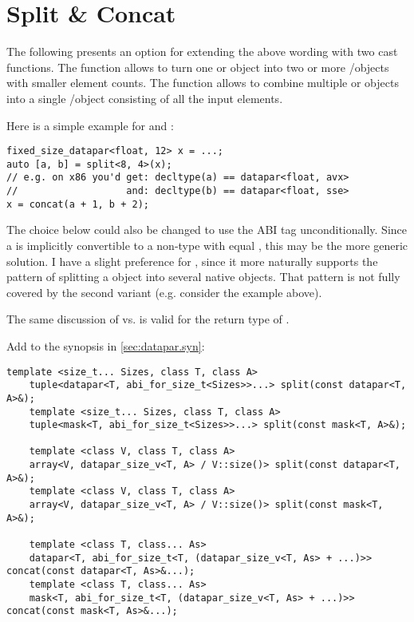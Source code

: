 \section{Split \& Concat}\label{sec:split and concat}
The following presents an option for extending the above wording with two cast functions.
The  function allows to turn one \datapar or \mask object into two or more \datapar/\mask objects with smaller element counts.
The  function allows to combine multiple \datapar or \mask objects into a single \datapar/\mask object consisting of all the input elements.

 Here is a simple example for  and :
 \smallskip
\begin{lstlisting}[style=Vc]
fixed_size_datapar<float, 12> x = ...;
auto [a, b] = split<8, 4>(x);
// e.g. on x86 you'd get: decltype(a) == datapar<float, avx>
//                   and: decltype(b) == datapar<float, sse>
x = concat(a + 1, b + 2);
\end{lstlisting}

The  choice below could also be changed to use the \fixedsize ABI tag unconditionally.
Since a \fixedsize \datapar is implicitly convertible to a non-\fixedsize \datapar type with equal , this may be the more generic solution.
I have a slight preference for , since it more naturally supports the pattern of splitting a \fixedsize object into several native \datapar objects.
That pattern is not fully covered by the second  variant (e.g. consider the example above).

The same discussion of  vs. \fixedsize is valid for the return type of .

Add to the synopsis in \ref{sec:datapar.syn}:
\begin{wgText}
  \begin{lstlisting}[style=Vc]
    template <size_t... Sizes, class T, class A>
    tuple<datapar<T, abi_for_size_t<Sizes>>...> split(const datapar<T, A>&);
    template <size_t... Sizes, class T, class A>
    tuple<mask<T, abi_for_size_t<Sizes>>...> split(const mask<T, A>&);

    template <class V, class T, class A>
    array<V, datapar_size_v<T, A> / V::size()> split(const datapar<T, A>&);
    template <class V, class T, class A>
    array<V, datapar_size_v<T, A> / V::size()> split(const mask<T, A>&);

    template <class T, class... As>
    datapar<T, abi_for_size_t<T, (datapar_size_v<T, As> + ...)>> concat(const datapar<T, As>&...);
    template <class T, class... As>
    mask<T, abi_for_size_t<T, (datapar_size_v<T, As> + ...)>> concat(const mask<T, As>&...);
  \end{lstlisting}
\end{wgText}

